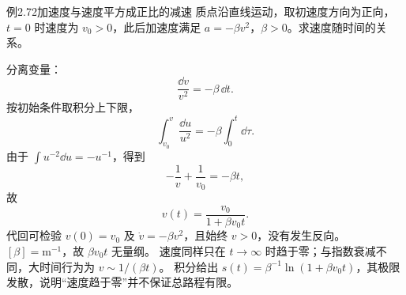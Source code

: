 \begin{origexamplebox}{例2.72\quad 加速度与速度平方成正比的减速}
质点沿直线运动，取初速度方向为正向，$t=0$ 时速度为 $v_0>0$，此后加速度满足 $a=-\beta v^2$，$\beta>0$。求速度随时间的关系。
\end{origexamplebox}
\begin{xesolution}
分离变量：
\[
\frac{\dd v}{v^2}=-\beta\,\dd t.
\]
按初始条件取积分上下限，
\[
 \int_{v_0}^{v}\frac{\dd u}{u^2}=-\beta\int_0^t\dd\tau.
\]
由于 $\int u^{-2}\dd u=-u^{-1}$，得到
\[
-\frac1v+\frac1{v_0}=-\beta t,
\]
故
\[
 \boxed{v(t)=\frac{v_0}{1+\beta v_0t}}.
\]
代回可检验 $v(0)=v_0$ 及 $\dot v=-\beta v^2$，且始终 $v>0$，没有发生反向。
$[\beta]=\mathrm{m^{-1}}$，故 $\beta v_0t$ 无量纲。
速度同样只在 $t\to\infty$ 时趋于零；与指数衰减不同，大时间行为为 $v\sim1/(\beta t)$。
积分给出 $s(t)=\beta^{-1}\ln(1+\beta v_0t)$，其极限发散，说明“速度趋于零”并不保证总路程有限。
\end{xesolution}
